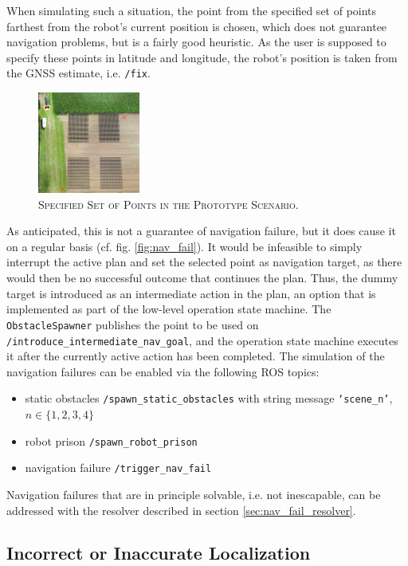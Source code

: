 \documentclass[english, master, utf8]{base/thesis_KBS}
\newcommand{\code}[1]{\colorbox{light-gray}{\texttt{#1}}}
\begin{document}
When simulating such a situation, the point from the specified set of points farthest from the robot's current position is chosen, which does not guarantee navigation problems,
but is a fairly good heuristic. As the user is supposed to specify these points in latitude and longitude, the robot's position is taken from the GNSS estimate, i.e. \code{/fix}.
\begin{figure}[H]
    \centering
    \includegraphics[width=0.3\textwidth]{pics/hard_to_reach.png}
    \caption{\textsc{Specified Set of  Points in the Prototype Scenario.}}
    \label{fig:outlier_points}
\end{figure}
As anticipated, this is not a guarantee of navigation failure, but it does cause it on a regular basis (cf. fig. \ref{fig:nav_fail}). It would be infeasible to simply interrupt the
active plan and set the selected point as navigation target, as there would then be no successful outcome that continues the plan. Thus, the dummy target is introduced as an
intermediate action in the plan, an option that is implemented as part of the low-level operation state machine. The \code{ObstacleSpawner} publishes the point to be used on
\code{/introduce\_intermediate\_nav\_goal}, and the operation state machine executes it after the currently active action has been completed.
The simulation of the navigation failures can be enabled via the following ROS topics:
\begin{itemize}
    \item static obstacles \textrightarrow \code{/spawn\_static\_obstacles} with string message \code{`scene\_n'}, $n \in \{1, 2, 3, 4\}$
    \item robot prison \textrightarrow \code{/spawn\_robot\_prison}
    \item navigation failure \textrightarrow \code{/trigger\_nav\_fail}
\end{itemize}
Navigation failures that are in principle solvable, i.e. not inescapable, can be addressed with the resolver described in section \ref{sec:nav_fail_resolver}.

\subsection{Incorrect or Inaccurate Localization}
\label{sec:sim_and_mon_incorrect_localization}
\end{document}
